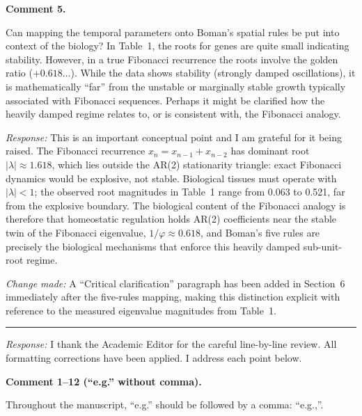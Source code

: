 \documentclass[12pt,a4paper]{article}
\newcommand{\reviewer}[1]{\medskip\noindent{\large\textbf{#1}}\par\smallskip}
\newcommand{\point}[1]{\medskip\noindent\textbf{Comment #1.}\enspace}
\newcommand{\response}{\noindent\textit{Response:}\enspace}
\newcommand{\change}{\noindent\textit{Change made:}\enspace}
\begin{document}
\point{5}

\begin{reviewbox}
Can mapping the temporal parameters onto Boman's spatial rules be put
into context of the biology? In Table~1, the roots for genes are quite
small indicating stability. However, in a true Fibonacci recurrence the
roots involve the golden ratio ($+0.618\ldots$). While the data shows
stability (strongly damped oscillations), it is mathematically ``far''
from the unstable or marginally stable growth typically associated with
Fibonacci sequences. Perhaps it might be clarified how the heavily
damped regime relates to, or is consistent with, the Fibonacci analogy.
\end{reviewbox}

\response
This is an important conceptual point and I am grateful for it being
raised.
The Fibonacci recurrence $x_n = x_{n-1}+x_{n-2}$ has dominant root
$|\lambda|\approx 1.618$, which lies outside the AR(2) stationarity
triangle: exact Fibonacci dynamics would be explosive, not stable.
Biological tissues must operate with $|\lambda|<1$; the observed root
magnitudes in Table~1 range from 0.063 to 0.521, far from the explosive
boundary.
The biological content of the Fibonacci analogy is therefore that
homeostatic regulation holds AR(2) coefficients near the stable twin of
the Fibonacci eigenvalue, $1/\varphi\approx 0.618$, and Boman's five
rules are precisely the biological mechanisms that enforce this heavily
damped sub-unit-root regime.

\change
A ``Critical clarification'' paragraph has been added in Section~6
immediately after the five-rules mapping, making this distinction
explicit with reference to the measured eigenvalue magnitudes from
Table~1.

\bigskip
\hrule

\reviewer{Reviewer 2 (Academic Editor)}

\response
I thank the Academic Editor for the careful line-by-line review.
All formatting corrections have been applied.
I address each point below.

\point{1--12 (``e.g.'' without comma)}

\begin{reviewbox}
Throughout the manuscript, ``e.g.'' should be followed by a comma:
``e.g.,''.
\end{reviewbox}
\end{document}

